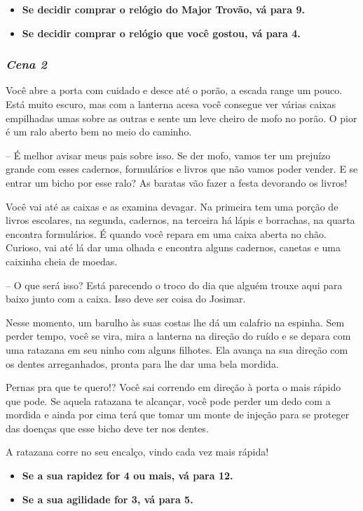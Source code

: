 \begin{itemize}
	\item \textbf{Se decidir comprar o relógio do Major Trovão, vá para 9.}
	\item \textbf{Se decidir comprar o relógio que você gostou, vá para 4.}
\end{itemize}

\bigskip\medskip

\subsubsection*{\textit{\textbf{Cena 2}}}
Você abre a porta com cuidado e desce até o porão, a escada range um pouco. Está muito escuro, mas com a lanterna acesa você consegue ver várias caixas empilhadas umas sobre as outras e sente um leve cheiro de mofo no porão. O pior é um ralo aberto bem no meio do caminho.

-- É melhor avisar meus pais sobre isso. Se der mofo, vamos ter um prejuízo grande com esses cadernos, formulários e livros que não vamos poder vender. E se entrar um bicho por esse ralo? As baratas vão fazer a festa devorando os livros!

Você vai até as caixas e as examina devagar. Na primeira tem uma porção de livros escolares, na segunda, cadernos, na terceira há lápis e borrachas, na quarta encontra formulários. É quando você repara em uma caixa aberta no chão. Curioso, vai até lá dar uma olhada e encontra alguns cadernos, canetas e uma caixinha cheia de moedas.

-- O que será isso? Está parecendo o troco do dia que alguém trouxe aqui para baixo junto com a caixa. Isso deve ser coisa do Josimar.

Nesse momento, um barulho às suas costas lhe dá um calafrio na espinha. Sem perder tempo, você se vira, mira a lanterna na direção do ruído e se depara com uma ratazana em seu ninho com alguns filhotes. Ela avança na sua direção com os dentes arreganhados, pronta para lhe dar uma bela mordida.

Pernas pra que te quero!? Você sai correndo em direção à porta o mais rápido que pode. Se aquela ratazana te alcançar, você pode perder um dedo com a mordida e ainda por cima terá que tomar um monte de injeção para se proteger das doenças que esse bicho deve ter nos dentes.

A ratazana corre no seu encalço, vindo cada vez mais rápida!

\begin{itemize}
	\item \textbf{Se a sua rapidez for 4 ou mais, vá para 12.}
	\item \textbf{Se a sua agilidade for 3, vá para 5.}
\end{itemize}


